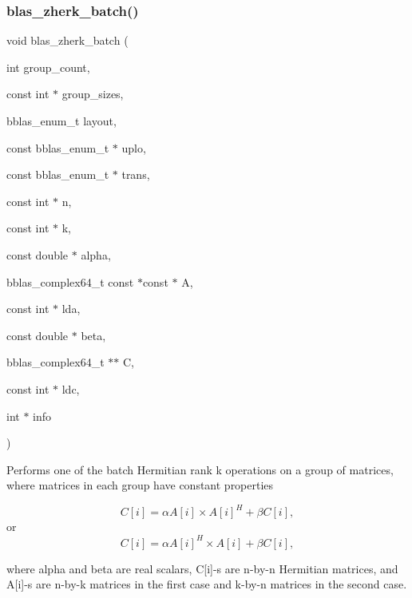 \subsubsection{\texorpdfstring{blas\+\_\+zherk\+\_\+batch()}{blas\_zherk\_batch()}}
{\footnotesize\ttfamily void blas\+\_\+zherk\+\_\+batch (\begin{DoxyParamCaption}\item[{int}]{group\+\_\+count,  }\item[{const int $\ast$}]{group\+\_\+sizes,  }\item[{bblas\+\_\+enum\+\_\+t}]{layout,  }\item[{const bblas\+\_\+enum\+\_\+t $\ast$}]{uplo,  }\item[{const bblas\+\_\+enum\+\_\+t $\ast$}]{trans,  }\item[{const int $\ast$}]{n,  }\item[{const int $\ast$}]{k,  }\item[{const double $\ast$}]{alpha,  }\item[{bblas\+\_\+complex64\+\_\+t const $\ast$const $\ast$}]{A,  }\item[{const int $\ast$}]{lda,  }\item[{const double $\ast$}]{beta,  }\item[{bblas\+\_\+complex64\+\_\+t $\ast$$\ast$}]{C,  }\item[{const int $\ast$}]{ldc,  }\item[{int $\ast$}]{info }\end{DoxyParamCaption})}

Performs one of the batch Hermitian rank k operations on a group of matrices, where matrices in each group have constant properties

\[ C[i] = \alpha A[i] \times A[i]^H + \beta C[i], \] or \[ C[i] = \alpha A[i]^H \times A[i] + \beta C[i], \]

where alpha and beta are real scalars, C\mbox{[}i\mbox{]}-\/s are n-\/by-\/n Hermitian matrices, and A\mbox{[}i\mbox{]}-\/s are n-\/by-\/k matrices in the first case and k-\/by-\/n matrices in the second case.



